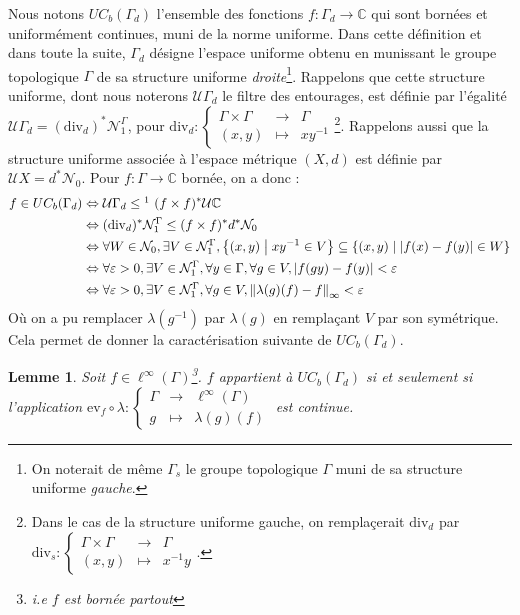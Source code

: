 \documentclass[a4paper,12pt]{article}
\newtheorem{lemma}[theorem]{Lemme}
\newcommand{\C}{\mathbb{C}}
\newcommand{\ev}{\mathrm{ev}}
\newcommand{\norm}[1]{\left\Vert #1\right\Vert}
\newcommand{\abs}[1]{\left\vert#1\right\vert}
\newcommand{\set}[1]{\left\{ #1 \right\}}
\newcommand\fundef[3]{#1: \left\{\begin{array}{ccc}#2\\#3\end{array}\right.}
\newcommand{\tq}{\;\middle|\;}
\newcommand{\ssi}{si et seulement si }
\newcommand{\inv}{^{-1}}
\newcommand{\comp}{\circ}
\newcommand{\nhds}{\mathcal{N}}
\renewcommand{\iff}{\Leftrightarrow}
\newcommand{\divop}{\mathrm{div}}
\begin{document}
Nous notons $UC_b(\Gamma_d)$ l'ensemble des fonctions $f:\Gamma_d\to\C$ qui sont bornées et uniformément 
continues, muni de la norme uniforme. Dans cette définition et dans toute la suite, $\Gamma_d$ désigne l'espace uniforme obtenu 
en munissant le groupe topologique $\Gamma$ de sa structure uniforme \emph{droite}\footnote{On noterait de même $\Gamma_s$
le groupe topologique $\Gamma$ muni de sa structure uniforme \emph{gauche}.}.
Rappelons que cette structure uniforme, dont nous noterons $\mathcal{U}\Gamma_d$ le filtre des entourages,
est définie par l'égalité $\mathcal{U}\Gamma_d=(\divop_d)^*\nhds_1^\Gamma$, pour 
$\fundef{\divop_d}{\Gamma\times\Gamma&\to&\Gamma}{(x, y)&\mapsto&x y\inv}$\footnote{Dans le cas de la structure 
uniforme gauche, on remplaçerait $\divop_d$ par $\fundef{\divop_s}{\Gamma\times\Gamma&\to&\Gamma}{(x, y)&\mapsto&x\inv y}$.}.
Rappelons aussi que la structure uniforme associée à l'espace métrique $(X, d)$ est définie par 
$\mathcal{U}X = d^*\nhds_0$. 
Pour $f:\Gamma\to\C$ bornée, on a donc : 
\begin{align}
    f\in UC_b(\Gamma_d)
        &\iff \mathcal{U}\Gamma_d \le\footnotemark\ (f\times f)^*\mathcal{U}\C \nonumber \\
        &\iff (\divop_d)^*\nhds_1^\Gamma \le (f\times f)^*d^*\nhds_0 \nonumber \\
        &\iff \forall W\in\nhds_0, \exists V\in\nhds_1^\Gamma, \set{(x, y)\tq x y\inv\in V} \subseteq \set{(x, y)\tq \abs{f(x)-f(y)}\in W} \nonumber \\
        &\iff \forall \varepsilon>0, \exists V\in\nhds_1^\Gamma, \forall y\in\Gamma, \forall g\in V, \abs{f(gy)-f(y)} < \varepsilon \nonumber \\
        &\iff \forall \varepsilon>0, \exists V\in\nhds_1^\Gamma, \forall g\in V, \norm{\lambda(g)(f) - f}_\infty < \varepsilon \label{UCB_explicit_cara}
\end{align}
Où on a pu remplacer $\lambda(g\inv)$ par $\lambda(g)$ en remplaçant $V$ par son symétrique. Cela permet de donner la caractérisation suivante de $UC_b(\Gamma_d)$.

\begin{lemma}\label{UCB_iff_translate}
    Soit $f\in\ell^\infty(\Gamma)$\footnote{i.e $f$ est bornée \emph{partout}}. $f$ appartient à $UC_b(\Gamma_d)$ \ssi l'application 
    $\fundef{\ev_f\comp\lambda}{\Gamma&\to&\ell^\infty(\Gamma)}{g&\mapsto&\lambda(g)(f)}$
    est continue.
\end{lemma}
\end{document}
